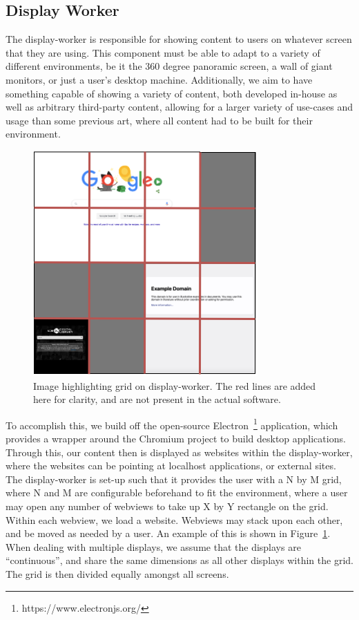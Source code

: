 \subsection{Display Worker}\label{sec:display-worker}

The display-worker is responsible for showing content to users on whatever screen
that they are using. This component must be able to adapt to a variety of different
environments, be it the 360 degree panoramic screen, a wall of giant monitors, or 
just a user's desktop machine. Additionally, we aim to have something capable of 
showing a variety of content, both developed in-house as well as arbitrary 
third-party content, allowing for a larger variety of use-cases and usage than
some previous art, where all content had to be built for their environment.

\begin{figure}
    \centering
    \includegraphics[width=0.5\columnwidth]{chapters/02_technology/figures/display_server.png}
    \caption{Image highlighting grid on display-worker. The red lines are added here for clarity, and are not present in the actual software.}
    \label{fig:display_server_grid}
\end{figure}

To accomplish this, we build off the open-source 
Electron~\footnote{https://www.electronjs.org/} application, which provides a
wrapper around the Chromium project to build desktop applications. Through this,
our content then is displayed as websites within the display-worker, where the 
websites can be pointing at localhost applications, or external sites. The 
display-worker is set-up such that it provides the user with a N by M grid, where
N and M are configurable beforehand to fit the environment, where a user may open
any number of webviews to take up X by Y rectangle on the grid. Within each
webview, we load a website. Webviews may stack upon each other, and be moved as 
needed by a user. An example of this is shown in 
Figure~\ref{fig:display_server_grid}. When dealing with multiple displays, we
assume that the displays are ``continuous'', and share the same dimensions as
all other displays within the grid. The grid is then divided equally amongst all 
screens.

